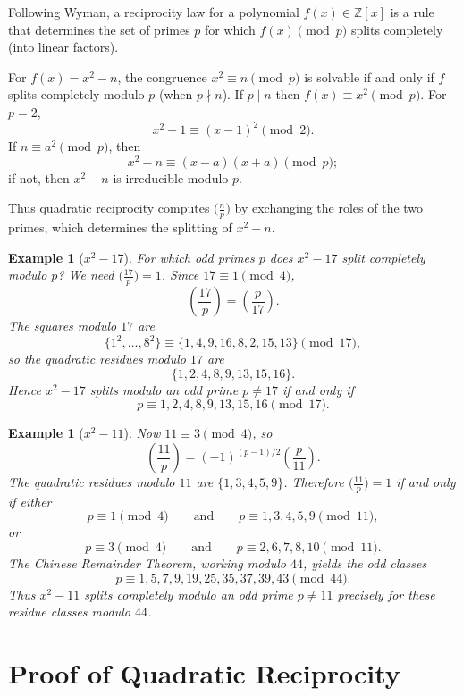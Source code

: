 \documentclass[11pt]{article}
\newtheorem{example}[theorem]{Example}
\theoremstyle{remark}
\newcommand{\Z}{\mathbb Z}
\begin{document}
Following Wyman, a reciprocity law for a polynomial $f(x)\in\Z[x]$ is a
rule that determines the set of primes $p$ for which $f(x)\pmod p$ splits
completely (into linear factors).

For $f(x)=x^2-n$, the congruence $x^2\equiv n\pmod p$ is solvable if and
only if $f$ splits completely modulo $p$ (when $p\nmid n$). If $p\mid n$
then $f(x)\equiv x^2\pmod p$. For $p=2$,
\[
    x^2-1\equiv(x-1)^2\pmod 2.
\]
If $n\equiv a^2\pmod p$, then
\[
    x^2-n\equiv(x-a)(x+a)\pmod p;
\]
if not, then $x^2-n$ is irreducible modulo $p$.

Thus quadratic reciprocity computes $\bigl(\frac np\bigr)$ by exchanging
the roles of the two primes, which determines the splitting of $x^2-n$.

\begin{example}[$x^2-17$]
For which odd primes $p$ does $x^2-17$ split completely modulo $p$? We need
$\bigl(\frac{17}{p}\bigr)=1$. Since $17\equiv 1\pmod 4$,
\[
    \left(\frac{17}{p}\right)=\left(\frac{p}{17}\right).
\]
The squares modulo $17$ are
\[
    \{1^2,\ldots,8^2\}
    \equiv
    \{1,4,9,16,8,2,15,13\}\pmod{17},
\]
so the quadratic residues modulo $17$ are
\[
    \{1,2,4,8,9,13,15,16\}.
\]
Hence $x^2-17$ splits modulo an odd prime $p\neq 17$ if and only if
\[
    p\equiv 1,2,4,8,9,13,15,16\pmod{17}.
\]
\end{example}

\begin{example}[$x^2-11$]
Now $11\equiv 3\pmod 4$, so
\[
    \left(\frac{11}{p}\right)
    =
    (-1)^{(p-1)/2}
    \left(\frac{p}{11}\right).
\]
The quadratic residues modulo $11$ are $\{1,3,4,5,9\}$. Therefore
$\bigl(\frac{11}{p}\bigr)=1$ if and only if either
\[
    p\equiv 1\pmod 4
    \qquad\text{and}\qquad
    p\equiv 1,3,4,5,9\pmod{11},
\]
or
\[
    p\equiv 3\pmod 4
    \qquad\text{and}\qquad
    p\equiv 2,6,7,8,10\pmod{11}.
\]
The Chinese Remainder Theorem, working modulo $44$, yields the odd classes
\[
    p\equiv 1,5,7,9,19,25,35,37,39,43\pmod{44}.
\]
Thus $x^2-11$ splits completely modulo an odd prime $p\neq 11$ precisely
for these residue classes modulo $44$.
\end{example}

\section{Proof of Quadratic Reciprocity}
\end{document}
